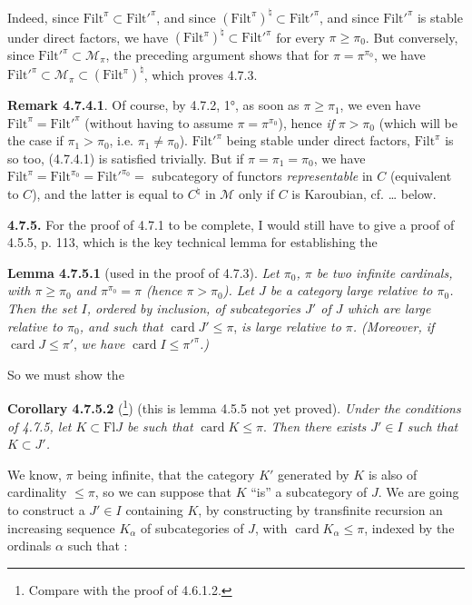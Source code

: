 \documentclass[11pt]{article}
\newcommand{\printedpage}[1]{\marginpar{\footnotesize p.~#1}}
\newcommand{\msp}[1]{\marginpar{\footnotesize [#1]}}
\newcommand{\Filt}{\mathrm{Filt}}
\newcommand{\card}{\operatorname{card}}
\begin{document}
Indeed, since $\Filt^{\pi} \subset \Filt'^{\pi}$, and since $(\Filt^{\pi})^{\natural} \subset \Filt'^{\pi}$, and since $\Filt'^{\pi}$ is stable under direct factors, we have $(\Filt^{\pi})^{\natural} \subset \Filt'^{\pi}$ for every $\pi \geqslant \pi_0$. But conversely, since $\Filt'^{\pi} \subset \mathcal{M}_{\pi}$, the preceding argument shows that for $\pi = \pi^{\pi_0}$, we have $\Filt'^{\pi} \subset \mathcal{M}_{\pi} \subset (\Filt^{\pi})^{\natural}$, which proves 4.7.3.

\textbf{Remark 4.7.4.1}. Of course, by 4.7.2, 1°, as soon as $\pi \geqslant \pi_1$, we even have $\Filt^{\pi} = \Filt'^{\pi}$ (without having to assume $\pi = \pi^{\pi_0}$), hence \textit{if} $\pi > \pi_0$ (which will be the case if $\pi_1 > \pi_0$, i.e. $\pi_1 \neq \pi_0$). $\Filt'^{\pi}$ being stable under direct factors, $\Filt^{\pi}$ is so too, (4.7.4.1) is satisfied trivially. But if $\pi = \pi_1 = \pi_0$, we have $\Filt^{\pi} = \Filt^{\pi_0} = \Filt'^{\pi_0} =$ subcategory of functors \textit{representable} in $C$ (equivalent to $C$), and the latter is equal to $C^{\natural}$ in $\mathcal{M}$ only if $C$ is Karoubian, cf. \ldots{} below. %

\printedpage{56}

\msp{page 168}
\textbf{4.7.5.} For the proof of 4.7.1 to be complete, I would still have to give a proof of 4.5.5, p. 113, which is the key technical lemma for establishing the

\textbf{Lemma 4.7.5.1} (used in the proof of 4.7.3). \textit{Let $\pi_0$, $\pi$ be two infinite cardinals, with $\pi \geqslant \pi_0$ and $\pi^{\pi_0} = \pi$ (hence $\pi > \pi_0$). Let $J$ be a category large relative to $\pi_0$. Then the set $I$, ordered by inclusion, of subcategories $J'$ of $J$ which are large relative to $\pi_0$, and such that} $\card J' \leqslant \pi$, \textit{is large relative to $\pi$. (Moreover, if} $\card J \leqslant \pi'$, \textit{we have} $\card I \leqslant \pi'^{\pi}$\textit{.)}

So we must show the

\textbf{Corollary 4.7.5.2} (\footnote[70]{Compare with the proof of 4.6.1.2.}) (this is lemma 4.5.5 not yet proved). \textit{Under the conditions of 4.7.5, let $K \subset \mathrm{Fl} J$ be such that} $\card K \leqslant \pi$. \textit{Then there exists $J' \in I$ such that $K \subset J'$.}

We know, $\pi$ being infinite, that the category $K'$ generated by $K$ is also of cardinality $\leqslant \pi$, so we can suppose that $K$ ``is'' a subcategory of $J$. We are going to construct a $J' \in I$ containing $K$, by constructing by transfinite recursion an increasing sequence $K_{\alpha}$ of subcategories of $J$, with $\card K_{\alpha} \leqslant \pi$, indexed by the ordinals $\alpha$ such that \fbox{$\card \alpha \leqslant \pi$}:
\end{document}
